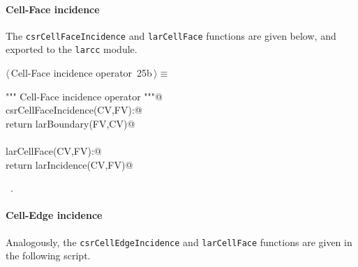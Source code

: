 \documentclass[11pt,oneside]{article}    %
\begin{document}
\paragraph{Cell-Face incidence}
The \texttt{csrCellFaceIncidence} and \texttt{larCellFace} functions are given below, and exported to the \texttt{larcc} module.
\begin{flushleft} \small \label{scrap40}
\protect{}$\langle\,$Cell-Face incidence operator\nobreak\ {\footnotesize 25b}$\,\rangle\equiv$
\vspace{-1ex}
\begin{list}{}{} \item
\mbox{}\verb@""" Cell-Face incidence operator """@\\
\mbox{}\verb@def csrCellFaceIncidence(CV,FV):@\\
\mbox{}\verb@    return larBoundary(FV,CV)@\\
\mbox{}\verb@@\\
\mbox{}\verb@def larCellFace(CV,FV):@\\
\mbox{}\verb@    return larIncidence(CV,FV)@\\
\mbox{}\verb@@{\NWsep}
\end{list}
\vspace{-1ex}
\footnotesize\addtolength{\baselineskip}{-1ex}
\begin{list}{}{\setlength{\itemsep}{-\parsep}\setlength{\itemindent}{-\leftmargin}}
\item \NWtxtMacroRefIn\ .
\end{list}
\end{flushleft}

\paragraph{Cell-Edge incidence}
Analogously, the \texttt{csrCellEdgeIncidence} and \texttt{larCellFace} functions are given in the following script.
\end{document}
